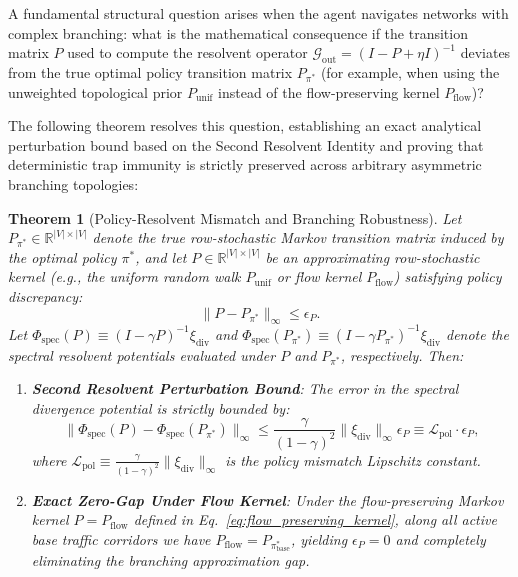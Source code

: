\documentclass[11pt,a4paper]{article}
\newtheorem{theorem}{Theorem}
\begin{document}
A fundamental structural question arises when the agent navigates networks with complex branching: what is the mathematical consequence if the transition matrix $P$ used to compute the resolvent operator $\mathcal{G}_{\text{out}} = (I - P + \eta I)^{-1}$ deviates from the true optimal policy transition matrix $P_{\pi^*}$ (for example, when using the unweighted topological prior $P_{\text{unif}}$ instead of the flow-preserving kernel $P_{\text{flow}}$)?

The following theorem resolves this question, establishing an exact analytical perturbation bound based on the Second Resolvent Identity and proving that deterministic trap immunity is strictly preserved across arbitrary asymmetric branching topologies:

\begin{theorem}[Policy-Resolvent Mismatch and Branching Robustness]
\label{thm:resolvent_mismatch}
Let $P_{\pi^*} \in \mathbb{R}^{|V| \times |V|}$ denote the true row-stochastic Markov transition matrix induced by the optimal policy $\pi^*$, and let $P \in \mathbb{R}^{|V| \times |V|}$ be an approximating row-stochastic kernel (e.g., the uniform random walk $P_{\text{unif}}$ or flow kernel $P_{\text{flow}}$) satisfying policy discrepancy:
\begin{equation}
\label{eq:policy_mismatch_error}
\|P - P_{\pi^*}\|_\infty \le \epsilon_P.
\end{equation}
Let $\Phi_{\text{spec}}(P) \equiv (I - \gamma P)^{-1} \xi_{\text{div}}$ and $\Phi_{\text{spec}}(P_{\pi^*}) \equiv (I - \gamma P_{\pi^*})^{-1} \xi_{\text{div}}$ denote the spectral resolvent potentials evaluated under $P$ and $P_{\pi^*}$, respectively. Then:
\begin{enumerate}
    \item \textbf{Second Resolvent Perturbation Bound}: The error in the spectral divergence potential is strictly bounded by:
    \begin{equation}
    \label{eq:resolvent_perturbation_bound}
    \|\Phi_{\text{spec}}(P) - \Phi_{\text{spec}}(P_{\pi^*})\|_\infty \le \frac{\gamma}{(1 - \gamma)^2} \|\xi_{\text{div}}\|_\infty \epsilon_P \equiv \mathcal{L}_{\text{pol}} \cdot \epsilon_P,
    \end{equation}
    where $\mathcal{L}_{\text{pol}} \equiv \frac{\gamma}{(1 - \gamma)^2} \|\xi_{\text{div}}\|_\infty$ is the policy mismatch Lipschitz constant.
    
    \item \textbf{Exact Zero-Gap Under Flow Kernel}: Under the flow-preserving Markov kernel $P = P_{\text{flow}}$ defined in Eq.~\eqref{eq:flow_preserving_kernel}, along all active base traffic corridors we have $P_{\text{flow}} = P_{\pi_{\text{base}}^*}$, yielding $\epsilon_P = 0$ and completely eliminating the branching approximation gap.
    

\end{enumerate}
\end{theorem}
\end{document}
